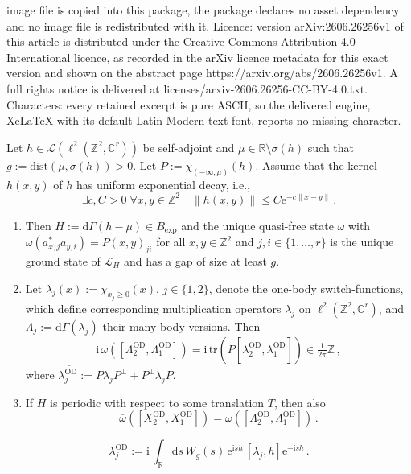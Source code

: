 \documentclass[10pt,a4paper]{amsart}
\newcommand{\C}{\mathbb{C}}
\newcommand{\ODT}[1][]{   ^{\widetilde{\mathrm{OD}}#1}   }
\newcommand{\OD}[1][]{   ^{\mathrm{OD}#1}   }
\newcommand{\R}{\mathbb{R}}
\newcommand{\Z}{\mathbb{Z}}
\newcommand{\dd}{\mathrm{d}}
\newcommand{\e}{\mathrm{e}}
\newcommand{\fd}{r}
\newcommand{\mL}{\mathcal{L}}
\newcommand{\tr}{\mathrm{tr}}
\newcommand{\w}{\omega}
\renewcommand{\i}{\mathrm{i}}
\begin{document}
image file is copied into this package, the package declares no asset dependency and no image file is redistributed with it. Licence: version arXiv:2606.26256v1 of this article is distributed under the Creative Commons Attribution 4.0 International licence, as recorded in the arXiv licence metadata for this exact version and shown on the abstract page https://arxiv.org/abs/2606.26256v1. A full rights notice is delivered at licenses/arxiv-2606.26256-CC-BY-4.0.txt. Characters: every retained excerpt is pure ASCII, so the delivered engine, XeLaTeX with its default Latin Modern text font, reports no missing character.
\begin{proposition}\label{prop:dcformulas}
 Let $h\in\mL(\ell^2(\Z^2,\C^\fd))$ be self-adjoint  and $\mu\in\R\setminus\sigma(h)$ such that $g:= \mathrm{dist}(\mu,\sigma(h))>0$.  Let $P:= \chi_{(-\infty,\mu)}(h)$. Assume that the kernel $h(x,y)$ of $h$ has uniform exponential decay, i.e.,
 \begin{equation}\label{hexp}
 \exists c,C>0\;\forall x,y\in\Z^2\quad \|h(x,y)\|\leq C\e^{-c\|x-y\|}\,.
 \end{equation}

\begin{enumerate}
    \item[(i)] 
 Then $H:=\dd\Gamma(h-\mu)\in B_{\exp}$ and the unique quasi-free state $\w$ with $\w(a^*_{x,j}a_{y,i}) = P(x,y)_{ji}$   for all $x,y\in\Z^2$ and $j,i\in\{1,\ldots,\fd\}$ is the unique ground state of $\mL_{H}$ and has a gap of size at least $g$.
\item[(ii)] 
Let $\lambda_j(x):= \chi_{x_j\geq 0}(x)$, $j\in\{1,2\}$,  denote the one-body switch-functions, which define  corresponding multiplication operators $\lambda_j$ on $\ell^2(\Z^2,\C^\fd)$, and $\Lambda_j := \dd\Gamma(\lambda_j)$ their many-body versions. Then
 \[
\i\,\w([\Lambda_2\OD,\Lambda_1\OD]) = \i\,\tr (P [\lambda_2\ODT,\lambda_1\ODT]) \in \tfrac{1}{2\pi} \Z\,,
 \]
 where $\lambda_j\ODT := P\lambda_jP^\perp +P^\perp\lambda_jP $.
\item[(iii)] 
 If $H$ is periodic with respect to some translation $T$, then also
 \[ \overline\w([X_2\OD,X_1\OD])=\w([\Lambda_2\OD,\Lambda_1\OD])\,.
 \]
 \end{enumerate}
\end{proposition}

\begin{equation} \label{lambdajOD}
\lambda_j\OD :=  \i \,  \int_{\R}\dd s \, W_g(s)\, \e^{\i s h} \,  [\lambda_j, h]\e^{-\i s h}\,.
\end{equation}
\end{document}
